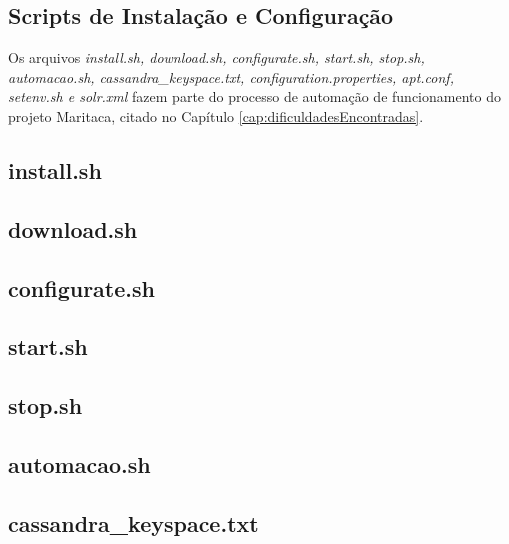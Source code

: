 \begin{apendicesenv}

\partapendices

\chapter{Scripts de Instalação e Configuração}
Os arquivos \textit{install.sh, download.sh, configurate.sh, start.sh, stop.sh, automacao.sh, cassandra\_keyspace.txt, configuration.properties, apt.conf, setenv.sh e solr.xml} fazem parte do processo de automação de funcionamento do projeto Maritaca, citado no Capítulo \ref{cap:dificuldadesEncontradas}.

\section*{install.sh}


\section*{download.sh}


\section*{configurate.sh}


\section*{start.sh}


\section*{stop.sh}


\section*{automacao.sh}


\section*{cassandra\_keyspace.txt}



\end{apendicesenv}
